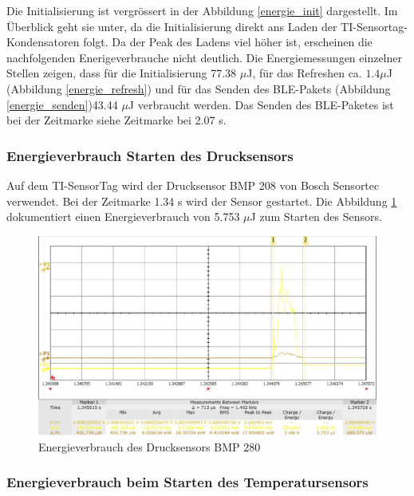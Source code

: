 \clearpage

Die Initialisierung ist vergrössert in der Abbildung  \ref{energie_init} dargestellt. Im Überblick geht sie unter, da die Initialisierung direkt ans Laden der TI-Sensortag-Kondensatoren folgt. Da der Peak des Ladens viel höher ist, erscheinen die nachfolgenden Enerigeverbrauche nicht deutlich. Die Energiemessungen einzelner Stellen zeigen, dass für die Initialisierung 77.38 $\mu$J, für das Refreshen ca. $1.4\mu$J (Abbildung \ref{energie_refresh}) und für das Senden des BLE-Pakets (Abbildung \ref{energie_senden})43.44 $\mu$J verbraucht werden. Das Senden des BLE-Paketes ist bei der Zeitmarke siehe Zeitmarke bei 2.07 s.


\subsubsection*{Energieverbrauch Starten des Drucksensors}

Auf dem TI-SensorTag wird der Drucksensor BMP 208 von Bosch Sensortec verwendet. Bei der Zeitmarke 1.34 s wird der Sensor gestartet. Die Abbildung \ref{energie_drucksensor} dokumentiert einen Energieverbrauch von 5.753 $\mu$J zum Starten des Sensors.

\begin{figure}[ht]
  \includegraphics[width=1.0\textwidth]{3Vorgehen/imag/Drucksensor.png}
  \caption{Energieverbrauch des Drucksensors BMP 280}
  \label{energie_drucksensor}
\end{figure}

\clearpage

\subsubsection*{Energieverbrauch beim Starten des Temperatursensors}

